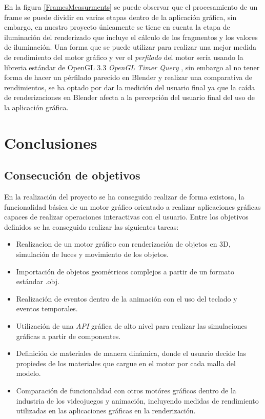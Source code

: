 \documentclass[a4paper]{book}
\begin{document}
En la figura \ref{FramesMeasurments} se puede observar que el procesamiento de un frame se puede dividir en varias etapas dentro de la aplicación
gráfica, sin embargo, en nuestro proyecto únicamente se tiene en cuenta la etapa de iluminación del renderizado que incluye el cálculo de los
fragmentos y los valores de iluminación. Una forma que se puede utilizar para realizar una mejor medida de rendimiento del motor gráfico y ver
el \textit{perfilado} del motor sería usando la libreria estándar de OpenGL 3.3 \textit{OpenGL Timer Query} \cite{fps_03:_opengl_timer_query}, sin embargo al no tener forma de hacer 
un pérfilado parecido en Blender y realizar una comparativa de rendimientos, se ha optado por dar la medición del usuario final ya que la caída
de renderizaciones en Blender afecta a la percepción del usuario final del uso de la aplicación gráfica. \cite{fps_01:__profiling_analytic}


\cleardoublepage
\chapter{Conclusiones}
\label{chap:conclusiones}


\section{Consecución de objetivos}
\label{sec:consecucion-objetivos}

En la realización del proyecto se ha conseguido realizar de forma existosa, la funcionalidad básica de un motor gráfico orientado
a realizar aplicaciones gráficas capaces de realizar operaciones interactivas con el usuario. Entre los objetivos definidos se ha
conseguido realizar las siguientes tareas:

\begin{itemize}
  \item Realizacion de un motor gráfico con renderización de objetos en 3D, simulación de luces y movimiento de los objetos.
  \item Importación de objetos geométricos complejos a partir de un formato estándar .obj.
  \item Realización de eventos dentro de la animación con el uso del teclado y eventos temporales.
  \item Utilización de una \textit{API} gráfica de alto nivel para realizar las simulaciones gráficas a partir de componentes.
  \item Definición de materiales de manera dinámica, donde el usuario decide las propiedes de los materiales que cargue en el motor
  por cada malla del modelo.
  \item Comparación de funcionalidad con otros motóres gráficos dentro de la industria de los videojuegos y animación, incluyendo medidas de
  rendimiento utilizadas en las aplicaciones gráficas en la renderización.
\end{itemize}
\end{document}
